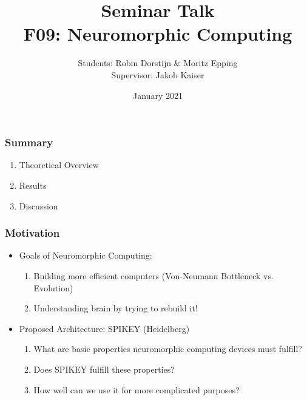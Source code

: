 \documentclass{beamer}
\title{Seminar Talk \\ F09: Neuromorphic Computing}
\author{Students: Robin Dorstijn \& Moritz Epping \\ Supervisor: Jakob Kaiser}
\institute{Universität Heidelberg}
\date{January 2021}
\begin{document}
\frame{\titlepage}

\begin{frame}
    \frametitle{Summary}
    \begin{enumerate}
        \item Theoretical Overview
        \item Results
        \item Discussion
    \end{enumerate}
\end{frame}

\begin{frame}
    \frametitle{Motivation}
   	\begin{itemize}
   		\item Goals of Neuromorphic Computing:
   		\begin{enumerate}
   			\item Building more efficient computers (Von-Neumann Bottleneck vs.  Evolution)
   			\item  Understanding brain by trying to rebuild it!
   		\end{enumerate}
   		\bigskip
   		\item Proposed Architecture: SPIKEY (Heidelberg)
   		\begin{enumerate}
   			\item What are basic properties neuromorphic computing devices must fulfill?
   			\item Does SPIKEY fulfill these properties?
   			\item How well can we use it for more complicated purposes?
   		\end{enumerate}
   	\end{itemize}
\end{frame}
\end{document}
